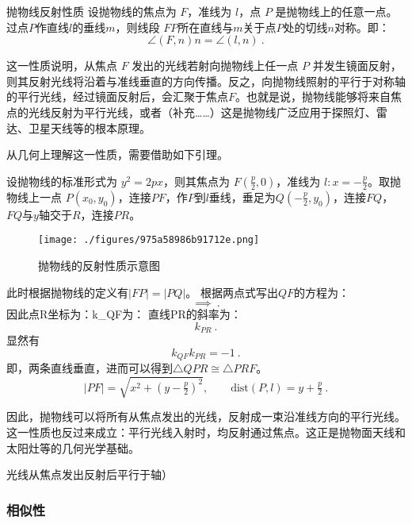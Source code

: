 \begin{theorem}{抛物线反射性质}
设抛物线的焦点为 $F$，准线为 $l$，点 $P$ 是抛物线上的任意一点。过点$P$作直线$l$的垂线$m$，则线段 $FP$所在直线与$m$关于点$P$处的切线$n$对称。即：
\begin{equation}
\angle(F, n)n = \angle(l, n)~.
\end{equation}
\end{theorem}

这一性质说明，从焦点 $F$ 发出的光线若射向抛物线上任一点 $P$ 并发生镜面反射，则其反射光线将沿着与准线垂直的方向传播。反之，向抛物线照射的平行于对称轴的平行光线，经过镜面反射后，会汇聚于焦点$F$。也就是说，抛物线能够将来自焦点的光线反射为平行光线，或者（补充……）这是抛物线广泛应用于探照灯、雷达、卫星天线等的根本原理。

从几何上理解这一性质，需要借助如下引理。

设抛物线的标准形式为 $y^2 = 2px$，则其焦点为 $\displaystyle F( \tfrac{p}{2},0)$，准线为 $l:\displaystyle x = -\tfrac{p}{2}$。取抛物线上一点 $P(x_0, y_0)$，连接$PF$，作$P$到$l$垂线，垂足为$Q(-\tfrac{p}{2},y_0)$，连接$FQ$，$FQ$与$y$轴交于$R$，连接$PR$。

\begin{figure}[ht]
\centering
\texttt{[image: ./figures/975a58986b91712e.png]}
\caption{抛物线的反射性质示意图} \label{fig_Para3_3}
\end{figure}

此时根据抛物线的定义有$|FP|=|PQ|$。
根据两点式写出$QF$的方程为：
\begin{equation}
\implies~.
\end{equation}
因此点R坐标为：k_{QF}为：
直线PR的斜率为：
\begin{equation}
k_{PR}~.
\end{equation}
显然有
\begin{equation}
k_{QF}k_{PR}=-1~.
\end{equation}
即，两条直线垂直，进而可以得到$\triangle QPR\cong\triangle PRF$。
\begin{equation}
|PF| = \sqrt{x^2 + (y - \tfrac{p}{2})^2}, \qquad \text{dist}(P, l) = y + \tfrac{p}{2}~.
\end{equation}



因此，抛物线可以将所有从焦点发出的光线，反射成一束沿准线方向的平行光线。这一性质也反过来成立：平行光线入射时，均反射通过焦点。这正是抛物面天线和太阳灶等的几何光学基础。


光线从焦点发出反射后平行于轴）
\subsubsection{相似性}

